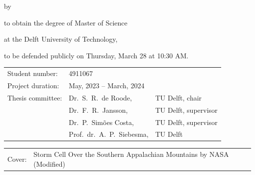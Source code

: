 \begin{titlepage}

\begin{center}

{\makeatletter
\largetitlestyle\fontsize{45}{45}\selectfont\@title
\makeatother}

{\makeatletter
\ifdefvoid{\@subtitle}{}{\bigskip\titlestyle\fontsize{20}{20}\selectfont\@subtitle}
\makeatother}

\bigskip
\bigskip

by

\bigskip
\bigskip

{\makeatletter
\largetitlestyle\fontsize{25}{25}\selectfont\@author
\makeatother}

\bigskip
\bigskip

to obtain the degree of Master of Science

at the Delft University of Technology,

to be defended publicly on Thursday, March 28 at 10:30 AM.

\vfill

\begin{tabular}{lll}
    Student number: & 4911067 \\
    Project duration: & \multicolumn{2}{l}{May, 2023 -- March, 2024} \\
    Thesis committee: & Dr.\ S.\ R.\ de Roode, & TU Delft, chair \\
                      & Dr.\ F.\ R.\ Jansson, & TU Delft, supervisor \\
                      & Dr.\ P.\ Simões Costa, & TU Delft, supervisor \\
                      & Prof.\ dr.\ A.\ P.\ Siebesma, & TU Delft
\end{tabular}

\bigskip
\bigskip

\bigskip
\bigskip
\begin{tabular}{p{15mm}p{10cm}}
    Cover: & Storm Cell Over the Southern Appalachian Mountains by NASA (Modified)\\
\end{tabular}


\end{center}
\end{titlepage}
